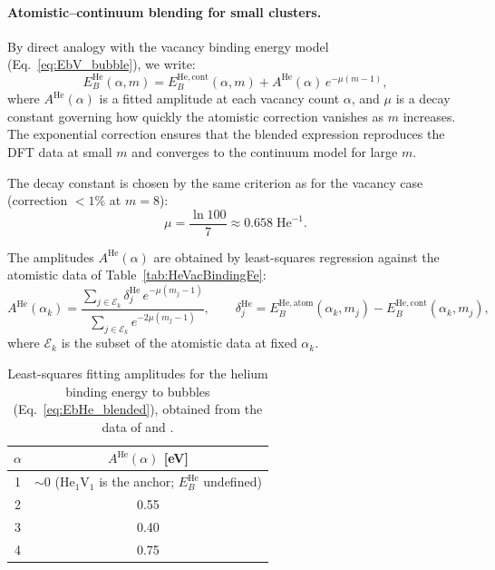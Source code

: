 \documentclass[pdflatex,sn-basic]{sn-jnl} %
\begin{document}
\paragraph{Atomistic--continuum blending for small clusters.}
By direct analogy with the vacancy binding energy model
(Eq.~\ref{eq:EbV_bubble}), we write:
\begin{equation}\label{eq:EbHe_blended}
    \boxed{E_B^{\mathrm{He}}(\alpha,m) =
    E_B^{\mathrm{He,cont}}(\alpha,m)
    + A^{\mathrm{He}}(\alpha)\,e^{-\mu(m - 1)},}
\end{equation}
where $A^{\mathrm{He}}(\alpha)$ is a fitted amplitude at each vacancy count
$\alpha$, and $\mu$ is a decay constant governing how quickly the atomistic
correction vanishes as $m$ increases. The exponential correction ensures that
the blended expression reproduces the DFT data at small $m$ and converges to
the continuum model for large $m$.

The decay constant is chosen by the same criterion as for the vacancy case
(correction $< 1\%$ at $m = 8$):
\begin{equation}\label{eq:mu_decay}
    \mu = \frac{\ln 100}{7} \approx 0.658 \;\mathrm{He}^{-1}.
\end{equation}

The amplitudes $A^{\mathrm{He}}(\alpha)$ are obtained by least-squares
regression against the atomistic data of
Table~\ref{tab:HeVacBindingFe}:
\begin{equation}\label{eq:AHe_fit}
    A^{\mathrm{He}}(\alpha_k) =
    \frac{\displaystyle\sum_{j\in\mathcal{E}_k}
          \delta_j^{\mathrm{He}}\,e^{-\mu(m_j-1)}}
         {\displaystyle\sum_{j\in\mathcal{E}_k}
          e^{-2\mu(m_j-1)}},
    \qquad
    \delta_j^{\mathrm{He}} = E_B^{\mathrm{He,atom}}(\alpha_k,m_j)
                            - E_B^{\mathrm{He,cont}}(\alpha_k,m_j),
\end{equation}
where $\mathcal{E}_k$ is the subset of the atomistic data at fixed $\alpha_k$.

\begin{table}[htbp]
    \centering
    \caption{Least-squares fitting amplitudes for the helium binding energy to
    bubbles (Eq.~\ref{eq:EbHe_blended}), obtained from the data of
    \citet{Fu2005He} and
    \citet{Caturla2008HeKineticModelling}.}
    \label{tab:A_He_bubble}
    \begin{tabular}{cc}
    \toprule
      $\alpha$ & $A^{\mathrm{He}}(\alpha)$ [eV] \\
    \midrule
      1 & $\sim$0 (He$_1$V$_1$ is the anchor; $E_B^{\mathrm{He}}$ undefined) \\
      2 & 0.55 \\
      3 & 0.40 \\
      4 & 0.75 \\
    \bottomrule
    \end{tabular}
\end{table}
\end{document}
